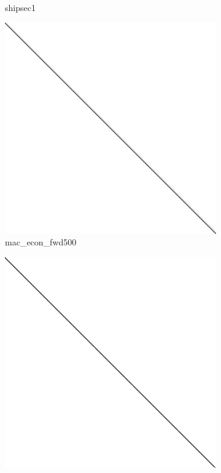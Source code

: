 \begin{figure}
\begin{multicols}{3}
\begin{subfigure}{\linewidth}
\caption{shipsec1}
\end{subfigure}
\begin{subfigure}{\linewidth}
\includegraphics[width=\linewidth]{images/mac_econ_fwd500}
\caption{mac\_econ\_fwd500}
\end{subfigure}
\begin{subfigure}{\linewidth}
\includegraphics[width=\linewidth]{images/cant}

\end{subfigure}
\end{multicols}
\end{figure}
